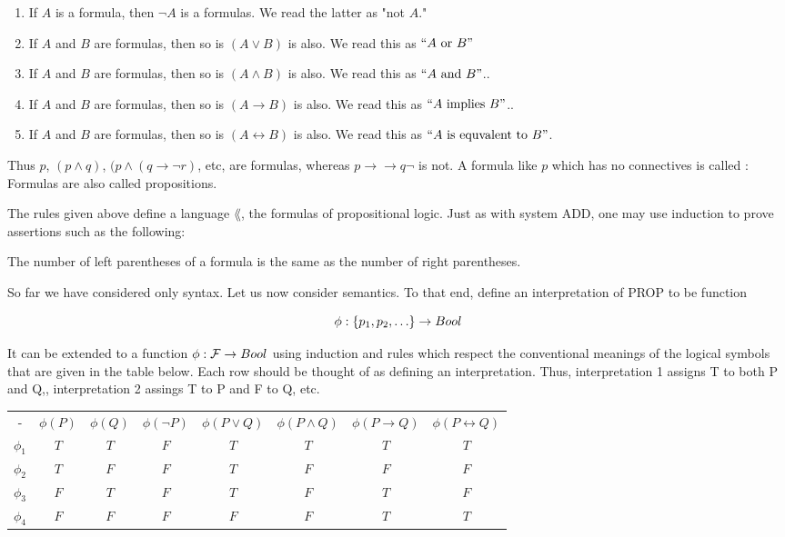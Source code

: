 \begin{enumerate}

\item If $A$ is a formula, then $\neg A$ is a formulas.  We read the latter as "not $A$."

\item If $A$ and $B$ are formulas, then so is $(A \lor B)$ is also. We read this as $``A \text{ or } B"$

\item If $A$ and $B$ are formulas, then so is $(A \land B)$ is also. We read this as $``A \text{ and } B"$..

\item If $A$ and $B$ are formulas, then so is $(A \to B)$ is also. We read this as $``A \text{ implies } B"$..

\item If $A$ and $B$ are formulas, then so is $(A \leftrightarrow B)$ is also. We read this as $``A \text{ is equvalent to } B"$.
\end{enumerate}

Thus $p$, $(p \land q)$, $(p \land (q \to \neg r)$, etc, are formulas, whereas $p \to \to q \neg$ is not.  A formula like $p$ which has no connectives is called :  Formulas are also called propositions. 

The rules given above define a language $\lang$, the formulas of propositional logic.  Just as with system ADD, one may use induction to prove assertions such as the following:

\begin{proposition}
The number of left parentheses of a formula is the same as the number of right parentheses.
\end{proposition}

So far we have considered only syntax.  Let us now consider semantics.
To that end, define an interpretation of PROP to be function 

\begin{equation}
\phi: \set{p_1, p_2, \dots} \to Bool
\end{equation}

It can be extended to a function $\phi: \mathcal{F} \to Bool$ using induction and rules which respect the conventional meanings of the logical symbols that are given in the table below.  Each row should be thought of as defining an interpretation. Thus, interpretation 1 assigns T to both P and Q,, interpretation 2 assings T to P and F to Q, etc.

\begin{indent}
\begin{tabular}{cccccccc}
- & $\phi(P)$ & $\phi(Q)$ & $\phi(\neg P)$ & $\phi(P \lor Q)$ & $\phi(P \land Q)$ & $\phi(P \to Q)$ & $\phi(P \leftrightarrow Q)$ \\
$\phi_1$ & $T$ & $T$ & $F$ & $T$ & $T$ & $T$ & $T$ \\
$\phi_2$ & $T$ & $F$ & $F$ & $T$ & $F$ & $F$ & $F$ \\
$\phi_3$ & $F$ & $T$ & $F$ & $T$ & $F$ & $T$ & $F$ \\
$\phi_4$ &$F$ & $F$ & $F$ & $F$ & $F$ & $T$ & $T $ \\
\end{tabular}
\end{indent}

